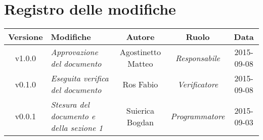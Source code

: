 \newpage
\section*{Registro delle modifiche}

\begin{table}[h]
\centering
\begin{tabular}{|c|p{}|c|c|c|}
	\toprule
		\textbf{Versione} & \textbf{Modifiche} & \textbf{Autore} & \textbf{Ruolo} & \textbf{Data}\\
	\midrule
	\midrule
		v1.0.0 & \textit{Approvazione del documento} & Agostinetto Matteo & \textit{Responsabile} & 2015-09-08\\
	\midrule
		v0.1.0 & \textit{Eseguita verifica del documento} & Ros Fabio & \textit{Verificatore} & 2015-09-08\\
	\midrule
		v0.0.1 & \textit{Stesura del documento e della sezione 1} & Suierica Bogdan & \textit{Programmatore} & 2015-09-03\\
	\bottomrule	
	\end{tabular}
\end{table}
\newpage